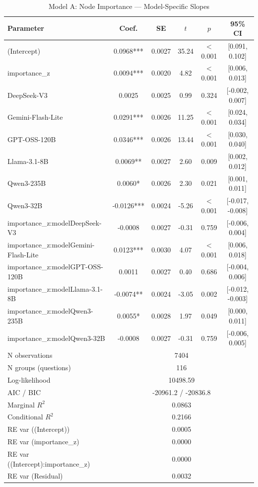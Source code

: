 \begin{table}[htbp]
\centering
\small
\caption{Model A: Node Importance --- Model-Specific Slopes}
\label{tab:lme_model_a_table}
\begin{tabular}{lccccc}
\toprule
Parameter & Coef. & SE & $t$ & $p$ & 95\% CI \\
\midrule
  (Intercept) & 0.0968*** & 0.0027 & 35.24 & $<$0.001 & [0.091, 0.102] \\
  importance\_z & 0.0094*** & 0.0020 & 4.82 & $<$0.001 & [0.006, 0.013] \\
  DeepSeek-V3 & 0.0025 & 0.0025 & 0.99 & 0.324 & [-0.002, 0.007] \\
  Gemini-Flash-Lite & 0.0291*** & 0.0026 & 11.25 & $<$0.001 & [0.024, 0.034] \\
  GPT-OSS-120B & 0.0346*** & 0.0026 & 13.44 & $<$0.001 & [0.030, 0.040] \\
  Llama-3.1-8B & 0.0069** & 0.0027 & 2.60 & 0.009 & [0.002, 0.012] \\
  Qwen3-235B & 0.0060* & 0.0026 & 2.30 & 0.021 & [0.001, 0.011] \\
  Qwen3-32B & -0.0126*** & 0.0024 & -5.26 & $<$0.001 & [-0.017, -0.008] \\
  importance\_z:modelDeepSeek-V3 & -0.0008 & 0.0027 & -0.31 & 0.759 & [-0.006, 0.004] \\
  importance\_z:modelGemini-Flash-Lite & 0.0123*** & 0.0030 & 4.07 & $<$0.001 & [0.006, 0.018] \\
  importance\_z:modelGPT-OSS-120B & 0.0011 & 0.0027 & 0.40 & 0.686 & [-0.004, 0.006] \\
  importance\_z:modelLlama-3.1-8B & -0.0074** & 0.0024 & -3.05 & 0.002 & [-0.012, -0.003] \\
  importance\_z:modelQwen3-235B & 0.0055* & 0.0028 & 1.97 & 0.049 & [0.000, 0.011] \\
  importance\_z:modelQwen3-32B & -0.0008 & 0.0027 & -0.31 & 0.759 & [-0.006, 0.005] \\
\midrule
  N observations & \multicolumn{5}{c}{7404} \\
  N groups (questions) & \multicolumn{5}{c}{116} \\
  Log-likelihood & \multicolumn{5}{c}{10498.59} \\
  AIC / BIC & \multicolumn{5}{c}{-20961.2 / -20836.8} \\
  Marginal $R^2$ & \multicolumn{5}{c}{0.0863} \\
  Conditional $R^2$ & \multicolumn{5}{c}{0.2166} \\
  RE var ((Intercept)) & \multicolumn{5}{c}{0.0005} \\
  RE var (importance\_z) & \multicolumn{5}{c}{0.0000} \\
  RE var ((Intercept):importance\_z) & \multicolumn{5}{c}{0.0000} \\
  RE var (Residual) & \multicolumn{5}{c}{0.0032} \\
\bottomrule
\end{tabular}
\end{table}
